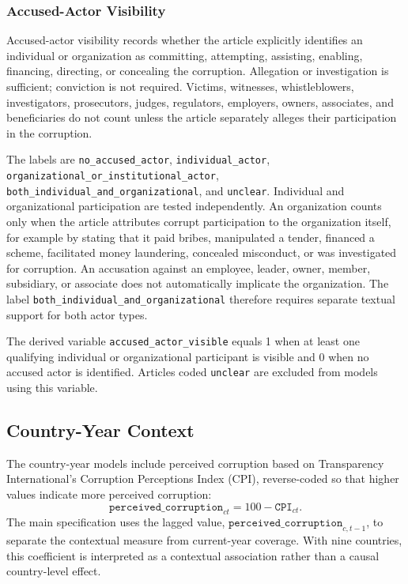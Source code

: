 \subsubsection{Accused-Actor Visibility}

Accused-actor visibility records whether the article explicitly identifies an
individual or organization as committing, attempting, assisting, enabling,
financing, directing, or concealing the corruption. Allegation or investigation
is sufficient; conviction is not required. Victims, witnesses, whistleblowers,
investigators, prosecutors, judges, regulators, employers, owners, associates,
and beneficiaries do not count unless the article separately alleges their
participation in the corruption.

The labels are \nolinkurl{no_accused_actor}, \nolinkurl{individual_actor},
\texttt{organizational\_or\_}\allowbreak\texttt{institutional\_actor},
\texttt{both\_individual\_and\_}\allowbreak\texttt{organizational}, and
\nolinkurl{unclear}.
Individual and organizational participation are tested independently. An
organization counts only when the article attributes corrupt participation to
the organization itself, for example by stating that it paid bribes,
manipulated a tender, financed a scheme, facilitated money laundering,
concealed misconduct, or was investigated for corruption. An accusation
against an employee, leader, owner, member, subsidiary, or associate does not
automatically implicate the organization. The label
\texttt{both\_individual\_and\_}\allowbreak\texttt{organizational} therefore
requires separate textual support for both actor types.

The derived variable \nolinkurl{accused_actor_visible} equals 1 when at least one
qualifying individual or organizational participant is visible and 0 when no
accused actor is identified. Articles coded \nolinkurl{unclear} are excluded from
models using this variable.

\subsection{Country-Year Context}
\label{sec:method-country-context}

The country-year models include perceived corruption based on Transparency
International's Corruption Perceptions Index (CPI), reverse-coded so that
higher values indicate more perceived corruption:
\[
\texttt{perceived\_corruption}_{ct}
  = 100 - \texttt{CPI}_{ct}.
\]
The main specification uses the lagged value,
$\texttt{perceived\_corruption}_{c,t-1}$, to separate the contextual measure from
current-year coverage. With nine countries, this coefficient is interpreted as
a contextual association rather than a causal country-level effect.
